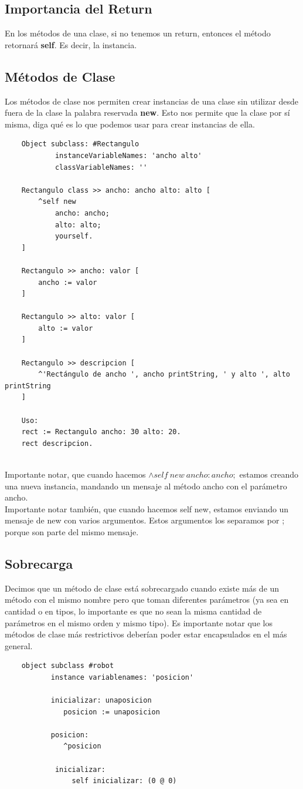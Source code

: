 \documentclass[10pt,a4paper]{article}
\begin{document}
\subsection*{Importancia del Return}
En los métodos de una clase, si no tenemos un return, entonces el método retornará \textbf{self}. Es decir, la instancia. 
\subsection*{Métodos de Clase}
Los métodos de clase nos permiten crear instancias de una clase sin utilizar desde fuera de la clase la palabra reservada \textbf{new}. Esto nos permite que la clase por sí misma, diga qué es lo que podemos usar para crear instancias de ella. 
\begin{lstlisting}
    Object subclass: #Rectangulo 
            instanceVariableNames: 'ancho alto'
            classVariableNames: ''

    Rectangulo class >> ancho: ancho alto: alto [
        ^self new 
            ancho: ancho;
            alto: alto;
            yourself.
    ]

    Rectangulo >> ancho: valor [
        ancho := valor
    ]

    Rectangulo >> alto: valor [
        alto := valor
    ]

    Rectangulo >> descripcion [
        ^'Rectángulo de ancho ', ancho printString, ' y alto ', alto printString
    ]

    Uso: 
    rect := Rectangulo ancho: 30 alto: 20.
    rect descripcion.


\end{lstlisting}
Importante notar, que cuando hacemos $\land self \ new \ ancho: ancho;$ estamos creando una nueva instancia, mandando un mensaje al método ancho con el parámetro ancho. \\
Importante notar también, que cuando hacemos self new, estamos enviando un mensaje de new con varios argumentos. Estos argumentos los separamos por ; porque son parte del mismo mensaje.
\subsection*{Sobrecarga}
Decimos que un método de clase está sobrecargado cuando existe más de un método con el mismo nombre pero que toman diferentes parámetros (ya sea en cantidad o en tipos, lo importante es que no sean la misma cantidad de parámetros en el mismo orden y mismo tipo). Es importante notar que los métodos de clase más restrictivos deberían poder estar encapsulados en el más general. 
\begin{lstlisting}
    object subclass #robot 
           instance variablenames: 'posicion'

           inicializar: unaposicion
              posicion := unaposicion 

           posicion:
              ^posicion 
    
            inicializar:
                self inicializar: (0 @ 0)
\end{lstlisting}
\end{document}
